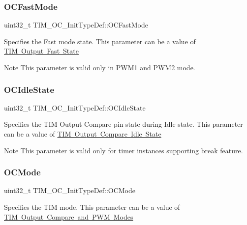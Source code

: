 \subsubsection{\texorpdfstring{OCFastMode}{OCFastMode}}
{\footnotesize\ttfamily uint32\+\_\+t T\+I\+M\+\_\+\+O\+C\+\_\+\+Init\+Type\+Def\+::\+O\+C\+Fast\+Mode}

Specifies the Fast mode state. This parameter can be a value of \mbox{\hyperlink{group___t_i_m___output___fast___state}{T\+IM Output Fast State}} \begin{DoxyNote}{Note}
This parameter is valid only in P\+W\+M1 and P\+W\+M2 mode. 
\end{DoxyNote}
\mbox{\label{struct_t_i_m___o_c___init_type_def_ace3e2b76ca2fca0f4961585ed9ebecf5}} 
\subsubsection{\texorpdfstring{OCIdleState}{OCIdleState}}
{\footnotesize\ttfamily uint32\+\_\+t T\+I\+M\+\_\+\+O\+C\+\_\+\+Init\+Type\+Def\+::\+O\+C\+Idle\+State}

Specifies the T\+IM Output Compare pin state during Idle state. This parameter can be a value of \mbox{\hyperlink{group___t_i_m___output___compare___idle___state}{T\+IM Output Compare Idle State}} \begin{DoxyNote}{Note}
This parameter is valid only for timer instances supporting break feature. 
\end{DoxyNote}
\mbox{\label{struct_t_i_m___o_c___init_type_def_ae5faa1cba0b3f1ab6179cc54e1015ee8}} 
\subsubsection{\texorpdfstring{OCMode}{OCMode}}
{\footnotesize\ttfamily uint32\+\_\+t T\+I\+M\+\_\+\+O\+C\+\_\+\+Init\+Type\+Def\+::\+O\+C\+Mode}

Specifies the T\+IM mode. This parameter can be a value of \mbox{\hyperlink{group___t_i_m___output___compare__and___p_w_m__modes}{T\+IM Output Compare and P\+WM Modes}} \mbox{\label{struct_t_i_m___o_c___init_type_def_a0d70cc51990d7433fd76cc6ed1d06237}} 
